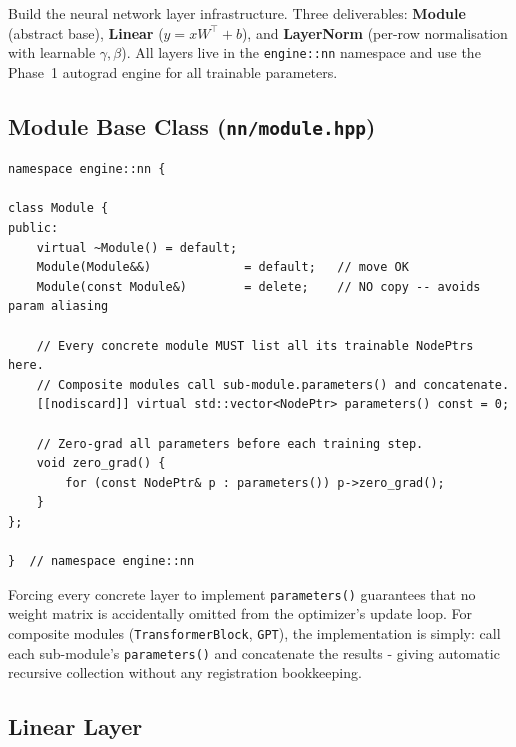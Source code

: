 \documentclass[12pt, a4paper]{article}
\begin{document}
\begin{tcolorbox}[designbox, title={Step 2.1 Goal}]
  Build the neural network layer infrastructure.  Three deliverables:
  \textbf{Module} (abstract base), \textbf{Linear} (\(y = xW^{\top}+b\)),
  and \textbf{LayerNorm} (per-row normalisation with learnable \(\gamma,\beta\)).
  All layers live in the \texttt{engine::nn} namespace and use the Phase~1
  autograd engine for all trainable parameters.
\end{tcolorbox}

\subsection{Module Base Class (\texttt{nn/module.hpp})}

\begin{lstlisting}[caption={\texttt{nn/module.hpp} - abstract base, header-only}]
namespace engine::nn {

class Module {
public:
    virtual ~Module() = default;
    Module(Module&&)             = default;   // move OK
    Module(const Module&)        = delete;    // NO copy -- avoids param aliasing

    // Every concrete module MUST list all its trainable NodePtrs here.
    // Composite modules call sub-module.parameters() and concatenate.
    [[nodiscard]] virtual std::vector<NodePtr> parameters() const = 0;

    // Zero-grad all parameters before each training step.
    void zero_grad() {
        for (const NodePtr& p : parameters()) p->zero_grad();
    }
};

}  // namespace engine::nn
\end{lstlisting}

\begin{tcolorbox}[interviewbox, title={Interview: Why is \texttt{parameters()} pure virtual?}]
  Forcing every concrete layer to implement \texttt{parameters()} guarantees
  that no weight matrix is accidentally omitted from the optimizer's update
  loop.  For composite modules (\texttt{TransformerBlock}, \texttt{GPT}), the
  implementation is simply: call each sub-module's \texttt{parameters()} and
  concatenate the results - giving automatic recursive collection without any
  registration bookkeeping.
\end{tcolorbox}

\subsection{Linear Layer}
\end{document}
